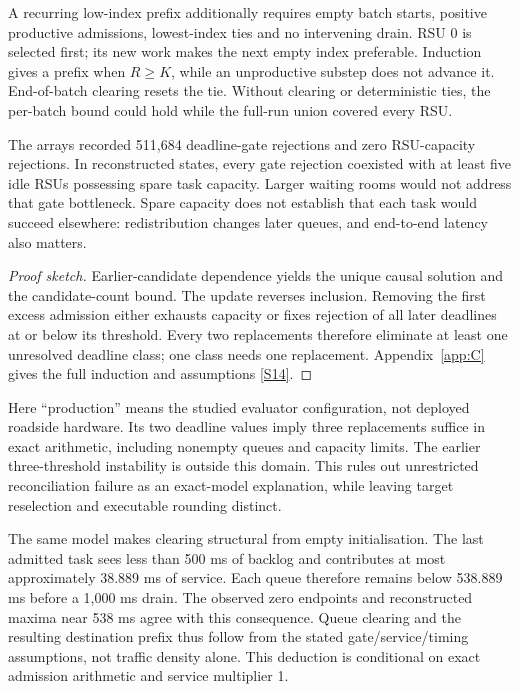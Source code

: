 \documentclass[12pt,a4paper]{article}
\begin{document}
A recurring low-index prefix additionally requires empty batch starts, positive productive admissions, lowest-index ties and no intervening drain. RSU 0 is selected first; its new work makes the next empty index preferable. Induction gives a prefix when $R\geq K$, while an unproductive substep does not advance it. End-of-batch clearing resets the tie. Without clearing or deterministic ties, the per-batch bound could hold while the full-run union covered every RSU.

The arrays recorded 511,684 deadline-gate rejections and zero RSU-capacity rejections. In reconstructed states, every gate rejection coexisted with at least five idle RSUs possessing spare task capacity. Larger waiting rooms would not address that gate bottleneck. Spare capacity does not establish that each task would succeed elsewhere: redistribution changes later queues, and end-to-end latency also matters.

\begin{proof}[Proof sketch]
Earlier-candidate dependence yields the unique causal solution and the candidate-count bound. The update reverses inclusion. Removing the first excess admission either exhausts capacity or fixes rejection of all later deadlines at or below its threshold. Every two replacements therefore eliminate at least one unresolved deadline class; one class needs one replacement. Appendix~\ref{app:C} gives the full induction and assumptions \hyperref[source-s14]{[S14]}.\end{proof}

Here ``production'' means the studied evaluator configuration, not deployed roadside hardware. Its two deadline values imply three replacements suffice in exact arithmetic, including nonempty queues and capacity limits. The earlier three-threshold instability is outside this domain. This rules out unrestricted reconciliation failure as an exact-model explanation, while leaving target reselection and executable rounding distinct.

The same model makes clearing structural from empty initialisation. The last admitted task sees less than 500 ms of backlog and contributes at most approximately 38.889 ms of service. Each queue therefore remains below 538.889 ms before a 1,000 ms drain. The observed zero endpoints and reconstructed maxima near 538 ms agree with this consequence. Queue clearing and the resulting destination prefix thus follow from the stated gate/service/timing assumptions, not traffic density alone. This deduction is conditional on exact admission arithmetic and service multiplier 1.
\end{document}
